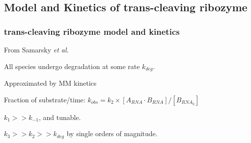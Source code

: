 \documentclass{beamer}
\begin{document}

\subsection{Model and Kinetics of trans-cleaving ribozyme}
\begin{frame}
\frametitle{trans-cleaving ribozyme model and kinetics}

From Samarsky \emph{et al.} 


\bigskip


\bigskip 

All species undergo degradation at some rate $k_{deg}$.

\bigskip

Approximated by MM kinetics

Fraction of substrate/time: $k_{obs} = k_2 \times [A_{RNA}\cdot B_{RNA}]/[B_{RNA_{0}}]$

$k_1>>k_{-1}$, and tunable.

$k_3>>k_2>>k_{deg}$ by single orders of magnitude. 

\end{frame}


%

\end{document}
